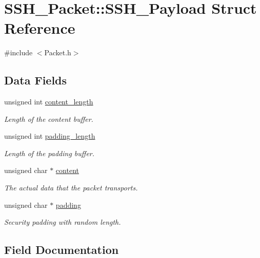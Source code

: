 \hypertarget{structSSH__Packet_1_1SSH__Payload}{}\section{S\+S\+H\+\_\+\+Packet\+:\+:S\+S\+H\+\_\+\+Payload Struct Reference}
\label{structSSH__Packet_1_1SSH__Payload}


{\ttfamily \#include $<$Packet.\+h$>$}

\subsection*{Data Fields}
\begin{DoxyCompactItemize}
\item 
unsigned int \hyperlink{structSSH__Packet_1_1SSH__Payload_ac9ee8ecb0b1c010959ffdd83ad36f5d4}{content\+\_\+length}
\begin{DoxyCompactList}\small\item\em Length of the content buffer. \end{DoxyCompactList}\item 
unsigned int \hyperlink{structSSH__Packet_1_1SSH__Payload_a51efea1b4439c6e97e13d583406b3b88}{padding\+\_\+length}
\begin{DoxyCompactList}\small\item\em Length of the padding buffer. \end{DoxyCompactList}\item 
unsigned char $\ast$ \hyperlink{structSSH__Packet_1_1SSH__Payload_a1032f8d26567fabcf8a4dc11d113523b}{content}
\begin{DoxyCompactList}\small\item\em The actual data that the packet transports. \end{DoxyCompactList}\item 
unsigned char $\ast$ \hyperlink{structSSH__Packet_1_1SSH__Payload_a15717400f2e8f8c8c10e955f86b391eb}{padding}
\begin{DoxyCompactList}\small\item\em Security padding with random length. \end{DoxyCompactList}\end{DoxyCompactItemize}


\subsection{Field Documentation}
